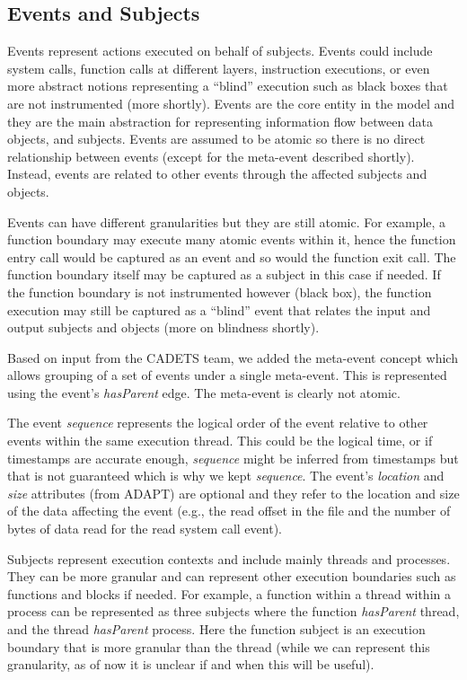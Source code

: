 \documentclass[10pt, conference, onecolumn]{IEEEtran}
\begin{document}
\subsection{Events and Subjects}\label{sec:conceptual:events}
Events represent actions executed on behalf of subjects. Events could include system calls, function calls at different layers, instruction executions, or even more abstract notions representing a ``blind'' execution such as black boxes that are not instrumented (more shortly). Events are the core entity in the model and they are the main abstraction for representing information flow between data objects, and subjects. 
Events are assumed to be atomic so there is no direct relationship between events (except for the meta-event described shortly). Instead, events are related to other events through the affected subjects and objects. 

Events can have different granularities but they are still atomic. For example, a function boundary may execute many atomic events within it, hence the function entry call would be captured as an event and so would the function exit call. The function boundary itself may be captured as a subject in this case if needed. If the function boundary is not instrumented however (black box), the function execution may still be captured as a ``blind'' event that relates the input and output subjects and objects (more on blindness shortly). 

Based on input from the CADETS team, we added the meta-event concept which allows grouping of a set of events under a single meta-event. This is represented using the event's \textit{hasParent} edge. The meta-event is clearly not atomic.

The event \textit{sequence} represents the logical order of the event relative to other events within the same execution thread. 
This could be the logical time, or if timestamps are accurate enough, \textit{sequence} might be inferred from timestamps but that is not guaranteed which is why we kept \textit{sequence}.
The event's \textit{location} and \textit{size} attributes (from ADAPT) are optional and they refer to the location and size of the data affecting the event (e.g., the read offset in the file and the number of bytes of data read for the read system call event).

Subjects represent execution contexts and include mainly threads and processes. They can be more granular and can represent other execution boundaries such as functions and blocks if needed. For example, a function within a thread within a process can be represented as three subjects where the function \textit{hasParent} thread, and the thread \textit{hasParent} process. Here the function subject is an execution boundary that is more granular than the thread (while we can represent this granularity, as of now it is unclear if and when this will be useful). 
\end{document}
